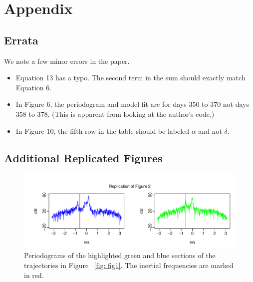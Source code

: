 \documentclass{stat572Style}
\begin{document}
\clearpage




\section{Appendix}

\subsection{Errata}
We note a few minor errors in the paper.
\begin{itemize}
\item Equation 13 has a typo. The second term in the sum should exactly match Equation 6. 
\item In Figure 6, the periodogram and model fit are for days 350 to 370 not days 358 to 378. (This is apparent from looking at the author's code.)
\item In Figure 10, the fifth row in the table should be labeled $\alpha$ and not $\delta$.
\end{itemize} 

\subsection{Additional Replicated Figures}

\begin{figure}[h!]
  \centering
    \includegraphics[width=\textwidth]{ReplicatedFigures/fig2.pdf}
        \caption{Periodograms of the highlighted green and blue sections of the trajectories in Figure ~\ref{fig: fig1}. The inertial frequencies are marked in red. }
        	\label{fig: fig2}
\end{figure}
\end{document}
